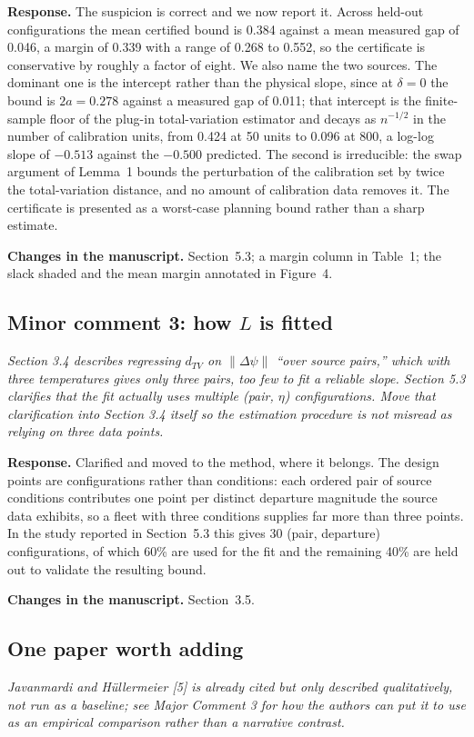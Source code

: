 \documentclass[11pt,a4paper]{article}
\newenvironment{comment}
  {\begin{list}{}{\leftmargin=6mm \rightmargin=2mm}\item[]\color{quoteline}\itshape}
  {\end{list}}
\newcommand{\where}[1]{\textbf{Changes in the manuscript.} #1}
\begin{document}
\noindent\textbf{Response.} The suspicion is correct and we now report it. Across held-out
configurations the mean certified bound is 0.384 against a mean measured gap of 0.046, a margin of
0.339 with a range of 0.268 to 0.552, so the certificate is conservative by roughly a factor of
eight. We also name the two sources. The dominant one is the intercept rather than the physical
slope, since at $\delta=0$ the bound is $2a=0.278$ against a measured gap of 0.011; that intercept
is the finite-sample floor of the plug-in total-variation estimator and decays as $n^{-1/2}$ in the
number of calibration units, from 0.424 at 50 units to 0.096 at 800, a log-log slope of $-0.513$
against the $-0.500$ predicted. The second is irreducible: the swap argument of Lemma~1 bounds the
perturbation of the calibration set by twice the total-variation distance, and no amount of
calibration data removes it. The certificate is presented as a worst-case planning bound rather
than a sharp estimate.

\where{Section~5.3; a margin column in Table~1; the slack shaded and the mean margin annotated in
Figure~4.}

\subsection*{Minor comment 3: how $L$ is fitted}
\begin{comment}
Section 3.4 describes regressing $d_{TV}$ on $\lVert\Delta\psi\rVert$ ``over source pairs,'' which
with three temperatures gives only three pairs, too few to fit a reliable slope. Section 5.3
clarifies that the fit actually uses multiple (pair, $\eta$) configurations. Move that clarification
into Section 3.4 itself so the estimation procedure is not misread as relying on three data points.
\end{comment}

\noindent\textbf{Response.} Clarified and moved to the method, where it belongs. The design points
are configurations rather than conditions: each ordered pair of source conditions contributes one
point per distinct departure magnitude the source data exhibits, so a fleet with three conditions
supplies far more than three points. In the study reported in Section~5.3 this gives 30
(pair, departure) configurations, of which 60\% are used for the fit and the remaining 40\% are held
out to validate the resulting bound.

\where{Section~3.5.}

\subsection*{One paper worth adding}
\begin{comment}
Javanmardi and Hüllermeier [5] is already cited but only described qualitatively, not run as a
baseline; see Major Comment 3 for how the authors can put it to use as an empirical comparison
rather than a narrative contrast.
\end{comment}
\end{document}
